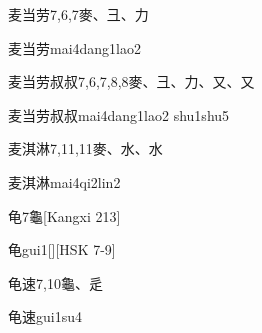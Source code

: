\begin{Entry}{麦当劳}{7,6,7}{⿆、⼹、⼒}
  \begin{Phonetics}{麦当劳}{mai4dang1lao2}
  \end{Phonetics}
\end{Entry}

\begin{Entry}{麦当劳叔叔}{7,6,7,8,8}{⿆、⼹、⼒、⼜、⼜}
  \begin{Phonetics}{麦当劳叔叔}{mai4dang1lao2 shu1shu5}
  \end{Phonetics}
\end{Entry}

\begin{Entry}{麦淇淋}{7,11,11}{⿆、⽔、⽔}
  \begin{Phonetics}{麦淇淋}{mai4qi2lin2}
  \end{Phonetics}
\end{Entry}

\begin{Entry}{龟}{7}{⿔}[Kangxi 213]
  \begin{Phonetics}{龟}{gui1}[][HSK 7-9]
  \end{Phonetics}
\end{Entry}

\begin{Entry}{龟速}{7,10}{⿔、⾡}
  \begin{Phonetics}{龟速}{gui1su4}
  \end{Phonetics}
\end{Entry}


